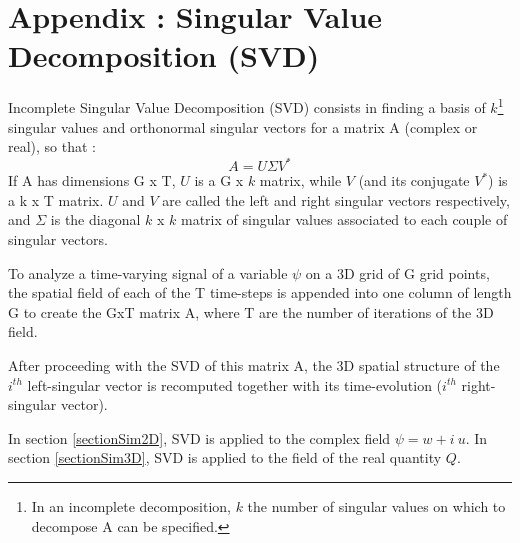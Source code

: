 \section{Appendix : Singular Value Decomposition (SVD)}
\label{annexeSVD}
Incomplete Singular Value Decomposition (SVD) consists in finding a basis of $k$\footnote{In an incomplete decomposition, $k$ the number of singular values on which to decompose A can be specified.} singular values and orthonormal singular vectors for a matrix A (complex or real), so that :
\begin{equation}
A = U \Sigma V^* 
\end{equation}
If A has dimensions G x T, $U$ is a G x $k$ matrix, while $V$ (and its conjugate $V^*$) is a k x T matrix. $U$ and $V$ are called the left and right singular vectors respectively, and $\Sigma$ is the diagonal $k$ x $k$ matrix of singular values associated to each couple of singular vectors.

To analyze a time-varying signal of a variable $\psi$ on a 3D grid of G grid points, the spatial field of each of the T time-steps is appended into one column of length G to create the GxT matrix A, where T are the number of iterations of the 3D field. 

After proceeding with the SVD of this matrix A, the 3D spatial structure of the $i^{th}$ left-singular vector is recomputed together with its time-evolution ($i^{th}$ right-singular vector).

In section \ref{sectionSim2D}, SVD is applied to the complex field $\psi=w+i\ u$. %
In section \ref{sectionSim3D}, SVD is applied to the field of the real quantity $Q$.
